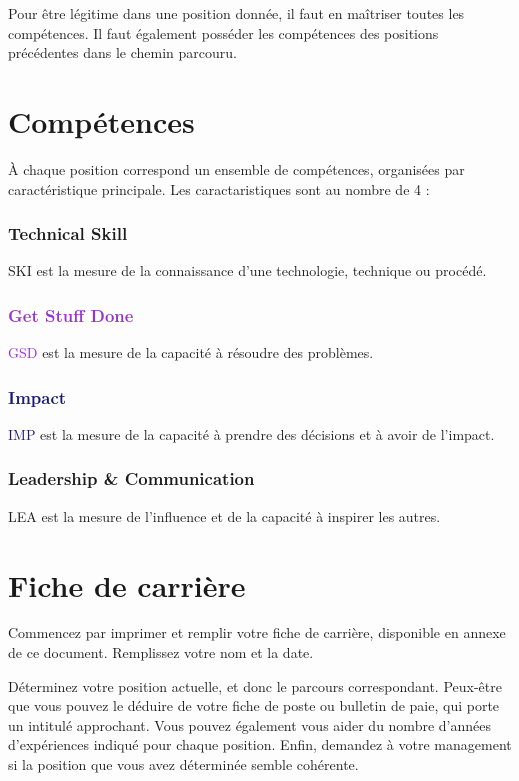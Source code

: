 \documentclass[a4paper, french, openany, 12pt]{book}
\newcommand\dexterity{\textcolor{BrickRed}{Technical Skill}}
\newcommand\strength{\textcolor{DarkOrchid}{Get Stuff Done}}
\newcommand\wisdom{\textcolor{MidnightBlue}{Impact}}
\newcommand\charisma{\textcolor{OliveGreen}{Leadership \& Communication}}
\begin{document}
\begin{multicols}{2}
  Pour être légitime dans une position donnée, il faut en maîtriser toutes les compétences.
  Il faut également posséder les compétences des positions précédentes dans le chemin parcouru.

  \section*{Compétences}

  À chaque position correspond un ensemble de compétences, organisées par caractéristique principale.
  Les caractaristiques sont au nombre de 4 :

  \subsubsection*{\dexterity}

  \textcolor{BrickRed}{\uppercase{ski}} est la mesure de la connaissance d'une technologie, technique ou procédé.

  \subsubsection*{\strength}

  \textcolor{DarkOrchid}{\uppercase{gsd}} est la mesure de la capacité à résoudre des problèmes.

  \subsubsection*{\wisdom}

  \textcolor{MidnightBlue}{\uppercase{imp}} est la mesure de la capacité à prendre des décisions et à avoir de l'impact.

  \subsubsection*{\charisma}

  \textcolor{OliveGreen}{\uppercase{lea}} est la mesure de l'influence et de la capacité à inspirer les autres.

  \section*{Fiche de carrière}

  Commencez par imprimer et remplir votre fiche de carrière, disponible en annexe de ce document.
  Remplissez votre nom et la date.

  Déterminez votre position actuelle, et donc le parcours correspondant.
  Peux-être que vous pouvez le déduire de votre fiche de poste ou bulletin de paie, qui porte un intitulé approchant.
  Vous pouvez également vous aider du nombre d'années d'expériences indiqué pour chaque position.
  Enfin, demandez à votre management si la position que vous avez déterminée semble cohérente.


\end{multicols}
\end{document}
